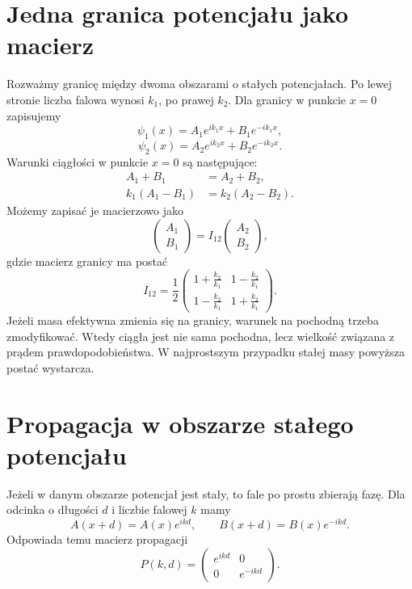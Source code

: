 \section{Jedna granica potencjału jako macierz}

Rozważmy granicę między dwoma obszarami o stałych potencjałach. Po lewej stronie liczba falowa wynosi \(k_1\), po prawej \(k_2\). Dla granicy w punkcie \(x=0\) zapisujemy
\begin{equation}
    \psi_1(x)=A_1e^{ik_1x}+B_1e^{-ik_1x},
\end{equation}
\begin{equation}
    \psi_2(x)=A_2e^{ik_2x}+B_2e^{-ik_2x}.
\end{equation}
Warunki ciągłości w punkcie \(x=0\) są następujące:
\begin{align}
    A_1+B_1 &= A_2+B_2,\\
    k_1(A_1-B_1) &= k_2(A_2-B_2).
\end{align}
Możemy zapisać je macierzowo jako
\begin{equation}
    \begin{pmatrix}A_1\\ B_1\end{pmatrix}
    =I_{12}
    \begin{pmatrix}A_2\\ B_2\end{pmatrix},
\end{equation}
gdzie macierz granicy ma postać
\begin{equation}
    I_{12}=\frac{1}{2}
    \begin{pmatrix}
    1+\frac{k_2}{k_1} & 1-\frac{k_2}{k_1}\\
    1-\frac{k_2}{k_1} & 1+\frac{k_2}{k_1}
    \end{pmatrix}.
\end{equation}
Jeżeli masa efektywna zmienia się na granicy, warunek na pochodną trzeba zmodyfikować. Wtedy ciągła jest nie sama pochodna, lecz wielkość związana z prądem prawdopodobieństwa. W najprostszym przypadku stałej masy powyższa postać wystarcza.

\section{Propagacja w obszarze stałego potencjału}

Jeżeli w danym obszarze potencjał jest stały, to fale po prostu zbierają fazę. Dla odcinka o długości \(d\) i liczbie falowej \(k\) mamy
\begin{equation}
    A(x+d)=A(x)e^{ikd},
    \qquad
    B(x+d)=B(x)e^{-ikd}.
\end{equation}
Odpowiada temu macierz propagacji
\begin{equation}
    P(k,d)=
    \begin{pmatrix}
    e^{ikd} & 0\\
    0 & e^{-ikd}
    \end{pmatrix}.
\end{equation}

